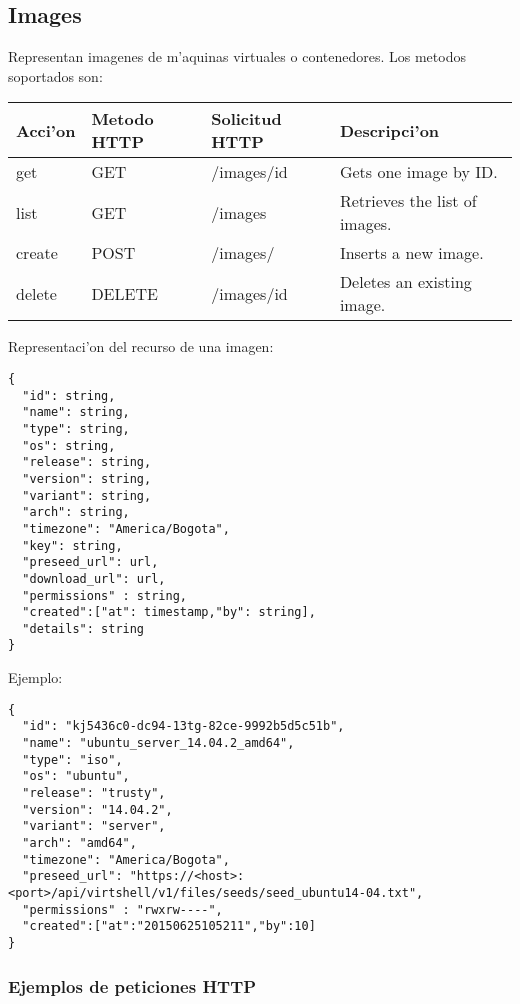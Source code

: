 \subsection{Images}
Representan imagenes de m'aquinas virtuales o contenedores. Los metodos soportados son:

\begin{center}
 \begin{tabular}{| l | l | l | l |}
 \hline
  \rowcolor{blueapi}
  \textbf{Acci'on} & \textbf{Metodo HTTP} & \textbf{Solicitud HTTP} & \textbf{Descripci'on} \\ [0.5ex] 
  \hline\hline
  get & GET & /images/id & Gets one image by ID. \\
  \hline
  list & GET & /images & Retrieves the list of images. \\
  \hline  
  create & POST & /images/ & Inserts a new image. \\
  \hline
  delete & DELETE & /images/id & Deletes an existing image. \\ [1ex] 
  \hline
\end{tabular}
\end{center}

\vspace{1cm}
Representaci'on del recurso de una imagen:
\vspace{1cm}

\begin{lstlisting}[style=json]
{
  "id": string,
  "name": string,
  "type": string,
  "os": string, 
  "release": string,
  "version": string, 
  "variant": string, 
  "arch": string, 
  "timezone": "America/Bogota", 
  "key": string,
  "preseed_url": url,
  "download_url": url,
  "permissions" : string,
  "created":["at": timestamp,"by": string],
  "details": string
}
\end{lstlisting}

Ejemplo:

\medskip
\begin{lstlisting}[style=json]
{
  "id": "kj5436c0-dc94-13tg-82ce-9992b5d5c51b",
  "name": "ubuntu_server_14.04.2_amd64",
  "type": "iso",
  "os": "ubuntu", 
  "release": "trusty",
  "version": "14.04.2", 
  "variant": "server", 
  "arch": "amd64", 
  "timezone": "America/Bogota", 
  "preseed_url": "https://<host>:<port>/api/virtshell/v1/files/seeds/seed_ubuntu14-04.txt",
  "permissions" : "rwxrw----",
  "created":["at":"20150625105211","by":10]
}
\end{lstlisting}

\subsubsection{Ejemplos de peticiones HTTP}

